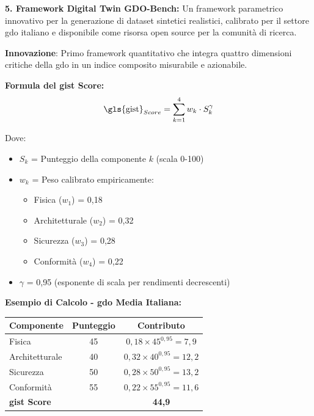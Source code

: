 \textbf{5. Framework Digital Twin GDO-Bench:} Un framework parametrico innovativo per la generazione di dataset sintetici realistici, calibrato per il settore \gls{gdo} italiano e disponibile come risorsa open source per la comunità di ricerca.

\begin{tcolorbox}[
    colback=green!5!white,
    colframe=green!75!black,
    title={\textbf{Nota Tecnica:} Framework \gls{gist} - Calcolo del Score di Maturità Digitale},
    fonttitle=\bfseries,
    boxrule=1.5pt,
    arc=2mm,
    breakable
]
\textbf{Innovazione}: Primo framework quantitativo che integra quattro dimensioni critiche della \gls{gdo} in un indice composito misurabile e azionabile.

\vspace{0.3cm}
\textbf{Formula del \gls{gist} Score:}
$$\text{\gls{gist}}_{Score} = \sum_{k=1}^{4} w_k \cdot S_k^{\gamma}$$

Dove:
\begin{itemize}
    \item $S_k$ = Punteggio della componente $k$ (scala 0-100)
    \item $w_k$ = Peso calibrato empiricamente:
    \begin{itemize}
        \item Fisica ($w_1$) = 0,18
        \item Architetturale ($w_2$) = 0,32
        \item Sicurezza ($w_3$) = 0,28
        \item Conformità ($w_4$) = 0,22
    \end{itemize}
    \item $\gamma$ = 0,95 (esponente di scala per rendimenti decrescenti)
\end{itemize}

\vspace{0.3cm}
\textbf{Esempio di Calcolo - \gls{gdo} Media Italiana:}

\begin{center}
\begin{tabular}{lcc}
\toprule
\textbf{Componente} & \textbf{Punteggio} & \textbf{Contributo} \\
\midrule
Fisica & 45 & $0,18 \times 45^{0,95} = 7,9$ \\
Architetturale & 40 & $0,32 \times 40^{0,95} = 12,2$ \\
Sicurezza & 50 & $0,28 \times 50^{0,95} = 13,2$ \\
Conformità & 55 & $0,22 \times 55^{0,95} = 11,6$ \\
\midrule
\textbf{\gls{gist} Score} & & \textbf{44,9} \\
\bottomrule
\end{tabular}
\end{center}


\end{tcolorbox}
